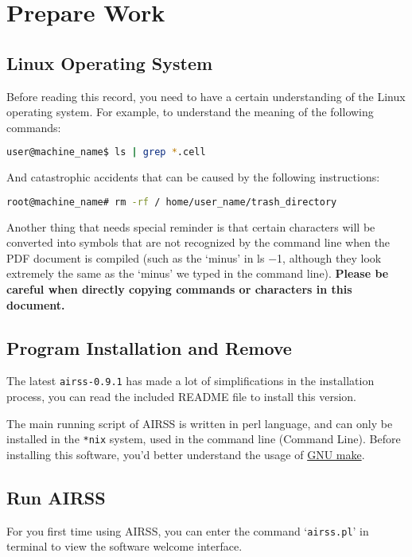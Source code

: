 \documentclass[a4paper, 10pt]{article}
\begin{document}
\newpage
\section{Prepare Work}
\subsection{Linux Operating System} 
Before reading this record, you need to have a certain understanding of the Linux operating system. For example, to understand the meaning of the following commands:
\begin{lstlisting}[language={bash}]
user@machine_name$ ls | grep *.cell
\end{lstlisting}

And catastrophic accidents that can be caused by the following instructions:
\begin{lstlisting}[language={bash}]
root@machine_name# rm -rf / home/user_name/trash_directory
\end{lstlisting}

Another thing that needs special reminder is that certain characters will be converted into symbols that are not recognized by the command line when the PDF document is compiled (such as the `minus' in ls \(-\)1, although they look extremely the same as the `minus' we typed in the command line). \textbf{Please be careful when directly copying commands or characters in this document.}

\subsection{Program Installation and Remove}

The latest \verb|airss-0.9.1| has made a lot of simplifications in the installation process, you can read the included README file to install this version.

The main running script of AIRSS is written in perl language, and can only be installed in the \verb|*nix| system, used in the command line (Command Line). Before installing this software, you'd better understand the usage of \href{https://www.gnu.org/software/make/manual/}{GNU make}.

\subsection{Run AIRSS}
For you first time using AIRSS, you can enter the command `\verb|airss.pl|' in terminal to view the software welcome interface.
\end{document}
